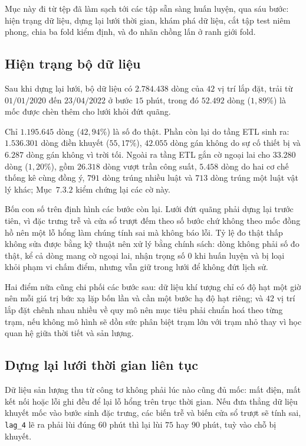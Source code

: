 Mục này đi từ tệp đã làm sạch tới các tập sẵn sàng huấn luyện, qua sáu bước: hiện trạng dữ
liệu, dựng lại lưới thời gian, khám phá dữ liệu, cắt tập test niêm phong, chia ba fold kiểm
định, và đo nhãn chồng lấn ở ranh giới fold.

\FloatBarrier
\subsection{Hiện trạng bộ dữ liệu}

Sau khi dựng lại lưới, bộ dữ liệu có $2.784.438$ dòng của $42$ vị trí lắp đặt, trải từ
$01/01/2020$ đến $23/04/2022$ ở bước $15$ phút, trong đó $52.492$ dòng ($1{,}89\%$) là mốc
được chèn thêm cho lưới khỏi đứt quãng.

Chỉ $1.195.645$ dòng ($42{,}94\%$) là số đo thật. Phần còn lại do tầng ETL sinh ra: $1.536.301$
dòng điền khuyết ($55{,}17\%$), $42.055$ dòng gán không do sự cố thiết bị và $6.287$ dòng gán
không vì trời tối. Ngoài ra tầng ETL gắn cờ ngoại lai cho $33.280$ dòng ($1{,}20\%$), gồm
$26.318$ dòng vượt trần công suất, $5.458$ dòng do hai cơ chế thống kê cùng đồng ý, $791$ dòng
trúng nhiều luật và $713$ dòng trúng một luật vật lý khác; Mục~$7.3.2$ kiểm chứng lại các cờ này.

Bốn con số trên định hình các bước còn lại. Lưới đứt quãng phải dựng lại trước tiên, vì đặc
trưng trễ và cửa sổ trượt đếm theo số bước chứ không theo mốc đồng hồ nên một lỗ hổng làm chúng
tính sai mà không báo lỗi. Tỷ lệ đo thật thấp không sửa được bằng kỹ thuật nên xử lý bằng chính
sách: dòng không phải số đo thật, kể cả dòng mang cờ ngoại lai, nhận trọng số $0$ khi huấn luyện
và bị loại khỏi phạm vi chấm điểm, nhưng vẫn giữ trong lưới để không đứt lịch sử.

Hai điểm nữa cũng chi phối các bước sau: dữ liệu khí tượng chỉ có độ hạt một giờ nên mỗi giá trị
bức xạ lặp bốn lần và cần một bước hạ độ hạt riêng; và $42$ vị trí lắp đặt chênh nhau nhiều về
quy mô nên mục tiêu phải chuẩn hoá theo từng trạm, nếu không mô hình sẽ dồn sức phân biệt trạm
lớn với trạm nhỏ thay vì học quan hệ giữa thời tiết và sản lượng.

\FloatBarrier
\subsection{Dựng lại lưới thời gian liên tục}

Dữ liệu sản lượng thu từ công tơ không phải lúc nào cũng đủ mốc: mất điện, mất kết nối
hoặc lỗi ghi đều để lại lỗ hổng trên trục thời gian. Nếu đưa thẳng dữ liệu khuyết mốc
vào bước sinh đặc trưng, các biến trễ và biến cửa sổ trượt sẽ tính sai, \texttt{lag\_4}
lẽ ra phải lùi đúng $60$ phút thì lại lùi $75$ hay $90$ phút, tuỳ vào chỗ bị khuyết.

